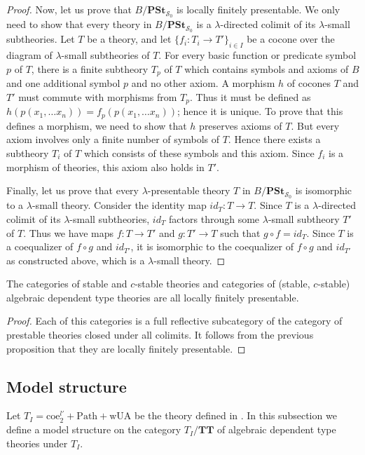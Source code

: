 \documentclass[reqno]{amsart}
\theoremstyle{definition}
\theoremstyle{remark}
\newcommand{\cat}[1]{\mathbf{#1}}
\newcommand{\PSt}{\cat{PSt}}
\newcommand{\algtt}{\cat{TT}}
\newcommand{\wUA}{\mathrm{wUA}}
\newcommand{\coeT}{\mathrm{coe}}
\newcommand{\PathT}{\mathrm{Path}}
\numberwithin{figure}{section}
\begin{document}
\begin{proof}
Now, let us prove that $B/\PSt_{\mathcal{S}_0}$ is locally finitely presentable.
We only need to show that every theory in $B/\PSt_{\mathcal{S}_0}$ is a $\lambda$-directed colimit of its $\lambda$-small subtheories.
Let $T$ be a theory, and let $\{ f_i : T_i \to T' \}_{i \in I}$ be a cocone over the diagram of $\lambda$-small subtheories of $T$.
For every basic function or predicate symbol $p$ of $T$,
there is a finite subtheory $T_p$ of $T$ which contains symbols and axioms of $B$ and one additional symbol $p$ and no other axiom.
A morphism $h$ of cocones $T$ and $T'$ must commute with morphisms from $T_p$.
Thus it must be defined as $h(p(x_1, \ldots x_n)) = f_p(p(x_1, \ldots x_n))$; hence it is unique.
To prove that this defines a morphism, we need to show that $h$ preserves axioms of $T$.
But every axiom involves only a finite number of symbols of $T$.
Hence there exists a subtheory $T_i$ of $T$ which consists of these symbols and this axiom.
Since $f_i$ is a morphism of theories, this axiom also holds in $T'$.

Finally, let us prove that every $\lambda$-presentable theory $T$ in $B/\PSt_{\mathcal{S}_0}$ is isomorphic to a $\lambda$-small theory.
Consider the identity map $id_T : T \to T$.
Since $T$ is a $\lambda$-directed colimit of its $\lambda$-small subtheories, $id_T$ factors through some $\lambda$-small subtheory $T'$ of $T$.
Thus we have maps $f : T \to T'$ and $g : T' \to T$ such that $g \circ f = id_T$.
Since $T$ is a coequalizer of $f \circ g$ and $id_{T'}$, it is isomorphic to the coequalizer of $f \circ g$ and $id_{T'}$ as constructed above, which is a $\lambda$-small theory.
\end{proof}

\begin{cor}
The categories of stable and $c$-stable theories and categories of (stable, $c$-stable) algebraic dependent type theories are all locally finitely presentable.
\end{cor}
\begin{proof}
Each of this categories is a full reflective subcategory of the category of prestable theories closed under all colimits.
It follows from the previous proposition that they are locally finitely presentable.
\end{proof}

\subsection{Model structure}

Let $T_I = \coeT^{l'}_2 + \PathT + \wUA$ be the theory defined in \cite{alg-models}.
In this subsection we define a model structure on the category $T_I/\algtt$ of algebraic dependent type theories under $T_I$.
\end{document}

